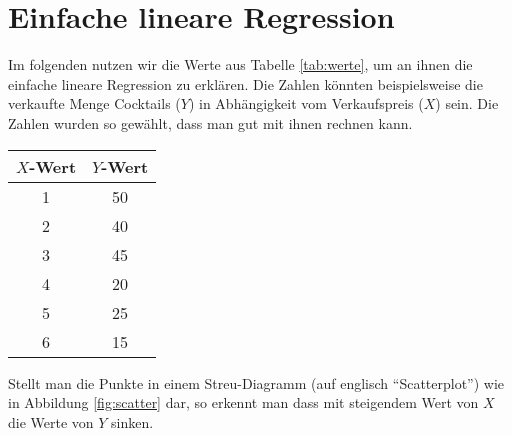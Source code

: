 \documentclass[ngerman, 12pt]{scrartcl}
\begin{document}
\section{Einfache lineare Regression}

Im folgenden nutzen wir die Werte aus Tabelle \ref{tab:werte}, um an ihnen die einfache lineare Regression zu erklären. Die Zahlen könnten beispielsweise die verkaufte Menge Cocktails (\(Y\)) in Abhängigkeit vom Verkaufspreis (\(X\)) sein. Die Zahlen wurden so gewählt, dass man gut mit ihnen rechnen kann. 

\begin{center}
\begin{tabular}{cc} \toprule[2pt]
$X$-Wert & $Y$-Wert \\ \midrule
        1 &50\\
        2 &40\\
        3 &45\\
        4 &20\\
        5 &25\\ 
        6 & 15 \\ \bottomrule[2pt]
\end{tabular}
\end{center}
\label{tab:werte}\vspace*{1em}

Stellt man die Punkte in einem Streu-Diagramm (auf englisch \enquote{Scatterplot}) wie in Abbildung \ref{fig:scatter} dar, so erkennt man dass mit steigendem Wert von $X$ die Werte von $Y$ sinken. 
\end{document}
